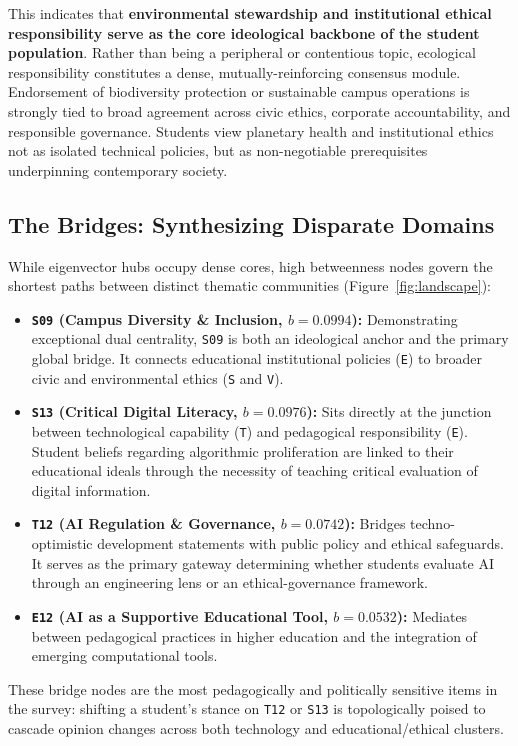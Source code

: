 \documentclass[11pt,a4paper]{article}
\begin{document}
This indicates that \textbf{environmental stewardship and institutional ethical responsibility serve as the core ideological backbone of the student population}. Rather than being a peripheral or contentious topic, ecological responsibility constitutes a dense, mutually-reinforcing consensus module. Endorsement of biodiversity protection or sustainable campus operations is strongly tied to broad agreement across civic ethics, corporate accountability, and responsible governance. Students view planetary health and institutional ethics not as isolated technical policies, but as non-negotiable prerequisites underpinning contemporary society.

\subsection{The Bridges: Synthesizing Disparate Domains}
While eigenvector hubs occupy dense cores, high betweenness nodes govern the shortest paths between distinct thematic communities (Figure~\ref{fig:landscape}):
\begin{itemize}
    \item \textbf{\texttt{S09} (Campus Diversity \& Inclusion, $b = 0.0994$):} Demonstrating exceptional dual centrality, \texttt{S09} is both an ideological anchor and the primary global bridge. It connects educational institutional policies (\texttt{E}) to broader civic and environmental ethics (\texttt{S} and \texttt{V}).
    \item \textbf{\texttt{S13} (Critical Digital Literacy, $b = 0.0976$):} Sits directly at the junction between technological capability (\texttt{T}) and pedagogical responsibility (\texttt{E}). Student beliefs regarding algorithmic proliferation are linked to their educational ideals through the necessity of teaching critical evaluation of digital information.
    \item \textbf{\texttt{T12} (AI Regulation \& Governance, $b = 0.0742$):} Bridges techno-optimistic development statements with public policy and ethical safeguards. It serves as the primary gateway determining whether students evaluate AI through an engineering lens or an ethical-governance framework.
    \item \textbf{\texttt{E12} (AI as a Supportive Educational Tool, $b = 0.0532$):} Mediates between pedagogical practices in higher education and the integration of emerging computational tools.
\end{itemize}

These bridge nodes are the most pedagogically and politically sensitive items in the survey: shifting a student's stance on \texttt{T12} or \texttt{S13} is topologically poised to cascade opinion changes across both technology and educational/ethical clusters.
\end{document}
